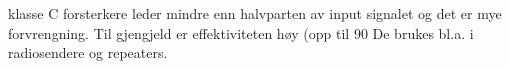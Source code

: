 klasse C forsterkere leder mindre enn halvparten av input signalet
og det er mye forvrengning.
Til gjengjeld er effektiviteten høy (opp til 90%
De brukes bl.a. i radiosendere og repeaters.
